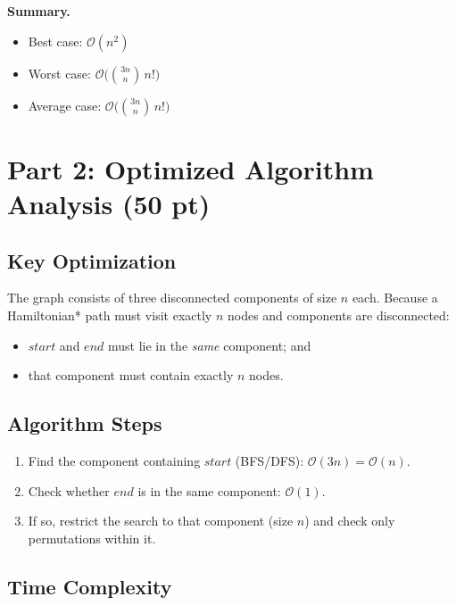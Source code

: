 \documentclass[11pt]{article}
\begin{document}
\medskip
\noindent\textbf{Summary.}
\begin{itemize}[left=1.2em]
	\item Best case: $\mathcal{O}(n^2)$
	\item Worst case: $\mathcal{O}\!\big(\binom{3n}{n}\, n!\big)$
	\item Average case: $\mathcal{O}\!\big(\binom{3n}{n}\, n!\big)$
\end{itemize}

\section*{Part 2: Optimized Algorithm Analysis (50 pt)}

\subsection*{Key Optimization}
The graph consists of three disconnected components of size $n$ each. Because a Hamiltonian* path must visit exactly $n$ nodes and components are disconnected:
\begin{itemize}[left=1.2em]
	\item $\textit{start}$ and $\textit{end}$ must lie in the \emph{same} component; and
	\item that component must contain exactly $n$ nodes.
\end{itemize}

\subsection*{Algorithm Steps}
\begin{enumerate}[label=\arabic*.]
	\item Find the component containing $\textit{start}$ (BFS/DFS): $\mathcal{O}(3n)=\mathcal{O}(n)$.
	\item Check whether $\textit{end}$ is in the same component: $\mathcal{O}(1)$.
	\item If so, restrict the search to that component (size $n$) and check only permutations within it.
\end{enumerate}

\subsection*{Time Complexity}
\end{document}
